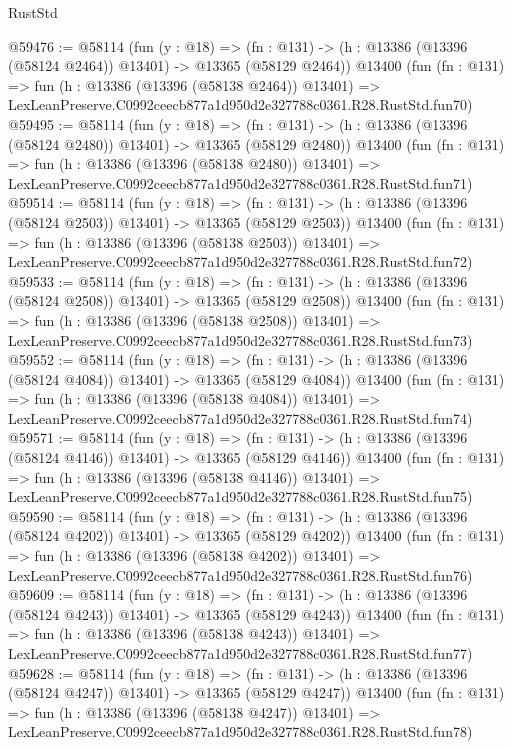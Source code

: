 \begin{lexlean}{RustStd}
\begin{coremodule}
@59476 := @58114
    (fun (y : @18) =>
    (fn : @131) -> (h : @13386 (@13396 (@58124 @2464)) @13401) -> @13365 (@58129 @2464))
    @13400
    (fun (fn : @131) =>
    fun (h : @13386 (@13396 (@58138 @2464)) @13401) =>
    LexLeanPreserve.C0992ceecb877a1d950d2e327788c0361.R28.RustStd.fun70)
@59495 := @58114
    (fun (y : @18) =>
    (fn : @131) -> (h : @13386 (@13396 (@58124 @2480)) @13401) -> @13365 (@58129 @2480))
    @13400
    (fun (fn : @131) =>
    fun (h : @13386 (@13396 (@58138 @2480)) @13401) =>
    LexLeanPreserve.C0992ceecb877a1d950d2e327788c0361.R28.RustStd.fun71)
@59514 := @58114
    (fun (y : @18) =>
    (fn : @131) -> (h : @13386 (@13396 (@58124 @2503)) @13401) -> @13365 (@58129 @2503))
    @13400
    (fun (fn : @131) =>
    fun (h : @13386 (@13396 (@58138 @2503)) @13401) =>
    LexLeanPreserve.C0992ceecb877a1d950d2e327788c0361.R28.RustStd.fun72)
@59533 := @58114
    (fun (y : @18) =>
    (fn : @131) -> (h : @13386 (@13396 (@58124 @2508)) @13401) -> @13365 (@58129 @2508))
    @13400
    (fun (fn : @131) =>
    fun (h : @13386 (@13396 (@58138 @2508)) @13401) =>
    LexLeanPreserve.C0992ceecb877a1d950d2e327788c0361.R28.RustStd.fun73)
@59552 := @58114
    (fun (y : @18) =>
    (fn : @131) -> (h : @13386 (@13396 (@58124 @4084)) @13401) -> @13365 (@58129 @4084))
    @13400
    (fun (fn : @131) =>
    fun (h : @13386 (@13396 (@58138 @4084)) @13401) =>
    LexLeanPreserve.C0992ceecb877a1d950d2e327788c0361.R28.RustStd.fun74)
@59571 := @58114
    (fun (y : @18) =>
    (fn : @131) -> (h : @13386 (@13396 (@58124 @4146)) @13401) -> @13365 (@58129 @4146))
    @13400
    (fun (fn : @131) =>
    fun (h : @13386 (@13396 (@58138 @4146)) @13401) =>
    LexLeanPreserve.C0992ceecb877a1d950d2e327788c0361.R28.RustStd.fun75)
@59590 := @58114
    (fun (y : @18) =>
    (fn : @131) -> (h : @13386 (@13396 (@58124 @4202)) @13401) -> @13365 (@58129 @4202))
    @13400
    (fun (fn : @131) =>
    fun (h : @13386 (@13396 (@58138 @4202)) @13401) =>
    LexLeanPreserve.C0992ceecb877a1d950d2e327788c0361.R28.RustStd.fun76)
@59609 := @58114
    (fun (y : @18) =>
    (fn : @131) -> (h : @13386 (@13396 (@58124 @4243)) @13401) -> @13365 (@58129 @4243))
    @13400
    (fun (fn : @131) =>
    fun (h : @13386 (@13396 (@58138 @4243)) @13401) =>
    LexLeanPreserve.C0992ceecb877a1d950d2e327788c0361.R28.RustStd.fun77)
@59628 := @58114
    (fun (y : @18) =>
    (fn : @131) -> (h : @13386 (@13396 (@58124 @4247)) @13401) -> @13365 (@58129 @4247))
    @13400
    (fun (fn : @131) =>
    fun (h : @13386 (@13396 (@58138 @4247)) @13401) =>
    LexLeanPreserve.C0992ceecb877a1d950d2e327788c0361.R28.RustStd.fun78)

\end{coremodule}
\end{lexlean}
